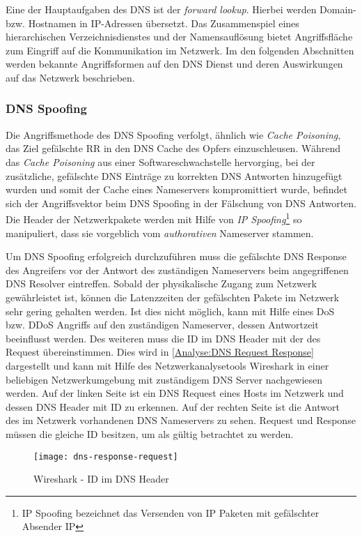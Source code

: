 Eine der Hauptaufgaben des \ac{DNS} ist der \textit{forward lookup}. Hierbei werden Domain- bzw. Hostnamen in \ac{IP}-Adressen übersetzt. Das Zusammenspiel eines hierarchischen Verzeichnisdienstes und der Namensauflösung bietet Angriffsfläche zum Eingriff auf die Kommunikation im Netzwerk. Im den folgenden Abschnitten werden bekannte Angriffsformen auf den \ac{DNS} Dienst und deren Auswirkungen auf das Netzwerk beschrieben.

\subsubsection{\ac{DNS} Spoofing}
Die Angriffsmethode des \ac{DNS} Spoofing verfolgt, ähnlich wie \textit{Cache Poisoning}, das Ziel gefälschte \ac{RR} in den \ac{DNS} Cache des Opfers einzuschleusen. Während das \textit{Cache Poisoning} aus einer Softwareschwachstelle hervorging, bei der zusätzliche, gefälschte \ac{DNS} Einträge zu korrekten \ac{DNS} Antworten hinzugefügt wurden und somit der Cache eines Nameservers kompromittiert wurde, befindet sich der Angriffsvektor beim \ac{DNS} Spoofing in der Fälschung von \ac{DNS} Antworten. Die Header der Netzwerkpakete werden mit Hilfe von \textit{IP Spoofing}\footnote{IP Spoofing bezeichnet das Versenden von IP Paketen mit gefälschter Absender IP} so manipuliert, dass sie vorgeblich vom \textit{authorativen} Nameserver stammen. 

Um \ac{DNS} Spoofing erfolgreich durchzuführen muss die gefälschte \ac{DNS} Response des Angreifers vor der Antwort des zuständigen Nameservers beim angegriffenen \ac{DNS} Resolver eintreffen. Sobald der physikalische Zugang zum Netzwerk gewährleistet ist, können die Latenzzeiten der gefälschten Pakete im Netzwerk sehr gering gehalten werden. Ist dies nicht möglich, kann mit Hilfe eines \ac{DoS} bzw. \ac{DDoS} Angriffs auf den zuständigen Nameserver, dessen Antwortzeit beeinflusst werden. Des weiteren muss die ID im \ac{DNS} Header mit der des Request übereinstimmen. Dies wird in \autoref{Analyse:DNS Request Response} dargestellt und kann mit Hilfe des Netzwerkanalysetools Wireshark in einer beliebigen Netzwerkumgebung mit zuständigem \ac{DNS} Server nachgewiesen werden. Auf der linken Seite ist ein DNS Request eines Hosts im Netzwerk und dessen \ac{DNS} Header mit ID zu erkennen. Auf der rechten Seite ist die Antwort des im Netzwerk vorhandenen \ac{DNS} Nameservers zu sehen. Request und Response müssen die gleiche ID besitzen, um als gültig betrachtet zu werden.

\begin{figure}[h]
    \centering
    \texttt{[image: dns-response-request]}
    \caption{Wireshark - ID im DNS Header}
    \label{Analyse:DNS Request Response}
\end{figure}

